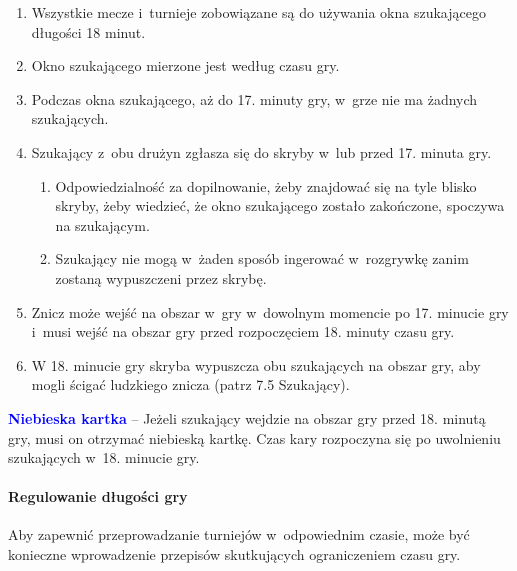 \documentclass[12pt]{article}
\newcommand\bluecard[1]{\bgroup\textcolor{blue}{\textbf{#1}}}
\begin{document}
\begin{enumerate}
	\item Wszystkie mecze i~turnieje zobowiązane są do używania okna
	      szukającego długości 18 minut.

	\item Okno szukającego mierzone jest według czasu gry.

	\item Podczas okna szukającego, aż do 17. minuty gry, w~grze nie ma żadnych
	      szukających.

	\item Szukający z~obu drużyn zgłasza się do skryby w~lub przed 17. minuta
	      gry.
	      \begin{enumerate}
		      \item Odpowiedzialność za dopilnowanie, żeby znajdować się na tyle blisko
		            skryby, żeby wiedzieć, że okno szukającego zostało zakończone, spoczywa
		            na szukającym.

		      \item Szukający nie mogą w~żaden sposób ingerować w~rozgrywkę zanim
		            zostaną wypuszczeni przez skrybę.
	      \end{enumerate}

	\item Znicz może wejść na obszar w~gry w~dowolnym momencie po 17. minucie
	      gry i~musi wejść na obszar gry przed rozpoczęciem 18. minuty czasu gry.

	\item W 18. minucie gry skryba wypuszcza obu szukających na obszar gry, aby
	      mogli ścigać ludzkiego znicza (patrz 7.5 Szukający).
\end{enumerate}

\bluecard{Niebieska kartka} -- Jeżeli szukający wejdzie na obszar gry przed
18. minutą gry, musi on otrzymać niebieską kartkę. Czas kary rozpoczyna
się po uwolnieniu szukających w~18. minucie gry.

\paragraph{Regulowanie długości gry}
Aby zapewnić
przeprowadzanie turniejów w~odpowiednim czasie, może być konieczne
wprowadzenie przepisów skutkujących ograniczeniem czasu gry.
\end{document}
